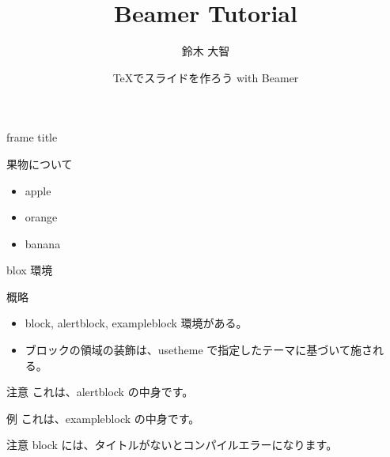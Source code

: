 \documentclass[dvipdfmx]{beamer}  %
\title{Beamer Tutorial}
\author[sudachi]{鈴木 大智}
\date[2021/02/25]{\TeX でスライドを作ろう with Beamer}
\institute[日本大学大学院]{日本大学大学院 理工学研究科 数学専攻}
\begin{document}
\frame{\maketitle}

\begin{frame}{frame title}

  果物について
  
  \begin{itemize}
    \item apple
    \item orange
    \item banana
  \end{itemize}
\end{frame}

\begin{frame}{blox 環境}

  \begin{block}{概略}
    \begin{itemize}
      \item block, alertblock, exampleblock 環境がある。
      \item ブロックの領域の装飾は、usetheme で指定したテーマに基づいて施される。
    \end{itemize}
  \end{block}

  \begin{alertblock}{注意}
    これは、alertblock の中身です。
  \end{alertblock}

  \begin{exampleblock}{例}
    これは、exampleblock の中身です。
  \end{exampleblock}

  \begin{alertblock}{注意}
    block には、タイトルがないとコンパイルエラーになります。
  \end{alertblock}

\end{frame}
\end{document}
